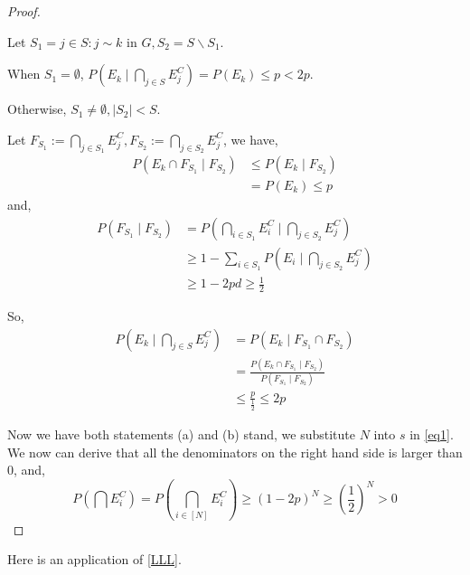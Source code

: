 \documentclass{article}
\begin{document}
\begin{proof}
\begin{enumerate}[(a)]
    Let $S_1 = {j\in S : j \sim k \mbox{ in } G}, S_2 = S \backslash S_1$.

    When $S_1 = \emptyset$, $P(E_k \mid \bigcap_{j\in S}E_j^C) = P(E_k) \leq p < 2p$.

    Otherwise, $S_1 \not = \emptyset, |S_2| < S$.
    
    Let $F_{S_1} := \bigcap_{j\in S_1}E_j^C, F_{S_2} := \bigcap_{j\in S_2} E_j^C$, we have,
    \begin{align*}
        P(E_k \cap F_{S_1} \mid F_{S_2}) &\leq P(E_k \mid F_{S_2}) \\
        &=  P(E_k) \leq p
    \end{align*}
    and,
    \begin{align*}
        P(F_{S_1} \mid F_{S_2}) &= P(\bigcap_{i\in S_1}E_i^C \mid \bigcap_{j\in S_2} E_j^C) \\
        &\geq 1 - \sum_{i\in S_1} P(E_i \mid \bigcap_{j \in S_2} E_j^C) \\
        &\geq 1-2pd \geq \frac{1}{2}
    \end{align*}

    So, 
    \begin{align*}
        P(E_k \mid \bigcap_{j\in S}E_j^C) &= P(E_k \mid F_{S_1} \cap F_{S_2}) \\
        &= \frac{P(E_k \cap F_{S_1} \mid F_{S_2})}{P(F_{S_1} \mid F_{S_2})} \\
        &\leq \frac{p}{\frac{1}{2}} \leq 2p
    \end{align*}
\end{enumerate}

Now we have both statements (a) and (b) stand, we substitute $N$ into $s$ in \cref{eq1}. We now can derive that all the denominators on the right hand side is larger than 0, and,
\[
    P(\bigcap E_i^C) = P(\bigcap_{i\in[N]}E_i^C) \geq (1-2p)^N \geq \left(\frac{1}{2}\right)^N > 0
\]

\end{proof}

Here is an application of \cref{LLL}.
\end{document}
